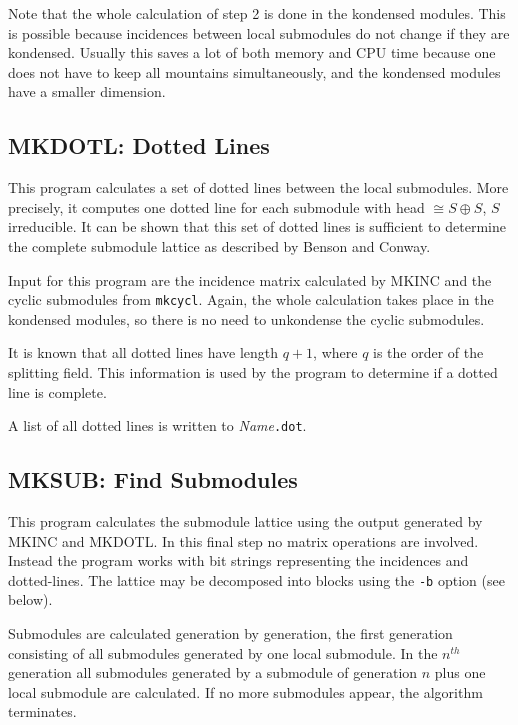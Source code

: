 Note that the whole calculation of step 2 is done in the kondensed
modules. This is possible because incidences between local submodules 
do not change if they are kondensed.
Usually this saves a lot of both memory and CPU time because one does
not have to keep all mountains simultaneously, and the kondensed
modules have a smaller dimension.





\subsection{MKDOTL: Dotted Lines}
\Syntax
{}

\Description
This program calculates a set of dotted lines between the local
submodules. More precisely, it computes one dotted line for
each submodule with head $\cong S\oplus S$, $S$ irreducible.
It can be shown that this set of dotted lines is sufficient to
determine the complete submodule lattice as described by
Benson and Conway.

Input for this program are the incidence matrix calculated by
MKINC and the cyclic submodules from {\tt mkcycl}. Again, the
whole calculation takes place in the kondensed
modules, so there is no need to unkondense the cyclic submodules.

It is known that all dotted lines have length $q+1$, where $q$ is the
order of the splitting field. This information is used by the program
to determine if a dotted line is complete.

A list of all dotted lines is written to {\it Name}{\tt.dot}.


\subsection{MKSUB: Find Submodules}
\Syntax
{}

\Description
This program calculates the submodule lattice using the output
generated by MKINC and MKDOTL. In this final step no
matrix operations are involved. Instead the program works with
bit strings representing the incidences and dotted-lines.
The lattice may be decomposed into blocks using the {\tt -b} option
(see below).

Submodules are calculated generation by generation, the first
generation consisting of all submodules generated by one 
local submodule. In the $n^{th}$ generation all submodules generated
by a submodule of generation $n$ plus one local submodule are
calculated. If no more submodules appear, the algorithm terminates.

